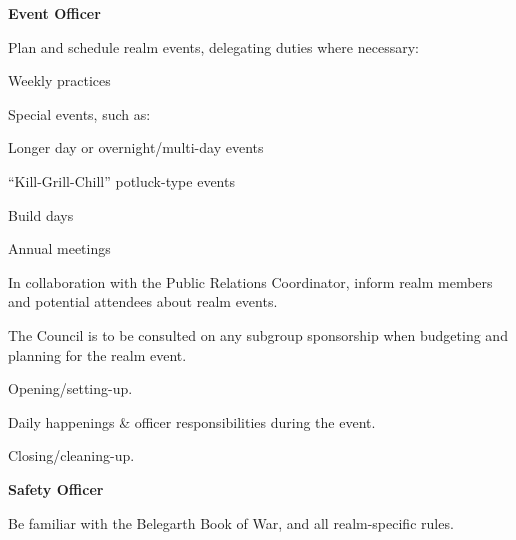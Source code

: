\documentclass[12pt]{article}
\begin{document}
\begin{level}
\begin{level}
\begin{level}
\begin{level}
            \end{level}
        \end{level}
        \item \textbf{Event Officer}
        \begin{level}
            \item Plan and schedule realm events, delegating duties where necessary:
            \begin{level}
                \item Weekly practices
                \item Special events, such as:
                \begin{level}
                    \item Longer day or overnight/multi-day events
                    \item “Kill-Grill-Chill” potluck-type events
                \end{level}
                \item Build days
                \item Annual meetings
            \end{level}
            \item In collaboration with the Public Relations Coordinator, inform realm members and potential attendees about realm events.
            \item The Council is to be consulted on any subgroup sponsorship when budgeting and planning for the realm event.
            \item {}
            \item {}
            \begin{level}
                \item Opening/setting-up.
                \item Daily happenings \& officer responsibilities during the event.
                \item Closing/cleaning-up.
            \end{level}
        \end{level}
        \item \textbf{Safety Officer}
        \begin{level}
            \item Be familiar with the Belegarth Book of War, and all realm-specific rules.

\end{level}
\end{level}
\end{level}
\end{document}
